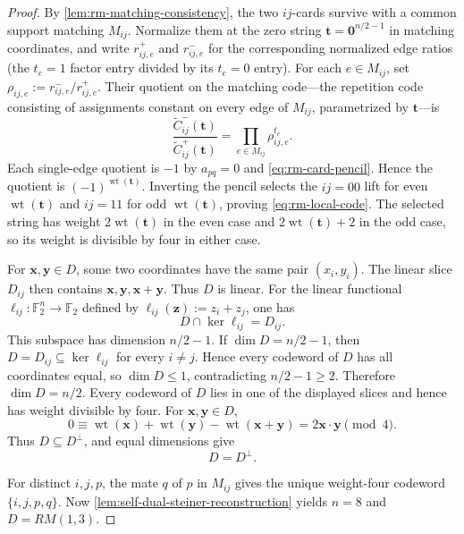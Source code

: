 \documentclass[11pt,letterpaper,onecolumn]{article}
\theoremstyle{plain}
\theoremstyle{definition}
\theoremstyle{remark}
\newcommand{\Ftwo}{\mathbb F_2}
\newcommand{\wt}{\operatorname{wt}}
\newcommand{\zero}{\mathbf 0}
\begin{document}
\begin{proof}
By \cref{lem:rm-matching-consistency}, the two \(ij\)-cards survive with a
common support matching \(M_{ij}\).  Normalize them at the zero string
\({\mathbf t}=\zero^{n/2-1}\) in matching coordinates, and write \(r_{ij,e}^{+}\) and
\(r_{ij,e}^{-}\) for the corresponding normalized edge ratios (the
\(t_e=1\) factor entry divided by its \(t_e=0\) entry).  For each
\(e\in M_{ij}\), set \(\rho_{ij,e}:=r_{ij,e}^{-}/r_{ij,e}^{+}\).  Their
quotient on the matching code---the repetition code consisting of assignments
constant on every edge of \(M_{ij}\), parametrized by \({\mathbf t}\)---is
\[
  \frac{\widetilde C_{ij}^{-}({\mathbf t})}
       {\widetilde C_{ij}^{+}({\mathbf t})}
  =\prod_{e\in M_{ij}}\rho_{ij,e}^{t_e}.
\]
Each single-edge quotient is \(-1\) by \(a_{pq}=0\) and
\cref{eq:rm-card-pencil}. Hence the quotient is \((-1)^{\wt({\mathbf t})}\).  Inverting
the pencil selects the \(ij=00\) lift for even \(\wt({\mathbf t})\) and \(ij=11\) for
odd \(\wt({\mathbf t})\), proving \cref{eq:rm-local-code}. The selected string has
weight \(2\wt({\mathbf t})\) in the even case and \(2\wt({\mathbf t})+2\) in the odd case, so
its weight is divisible by four in either case.

For \({\mathbf{x}},{\mathbf{y}}\in D\), some two coordinates have the same pair
\((x_i,y_i)\). The linear slice \(D_{ij}\) then contains \({\mathbf{x}},{\mathbf{y}},{\mathbf{x}}+{\mathbf{y}}\).
Thus \(D\) is linear.  For the linear functional
\(\ell_{ij}:\Ftwo^n\to\Ftwo\) defined by
\(\ell_{ij}({\mathbf z}):=z_i+z_j\), one has
\[
  D\cap\ker\ell_{ij}=D_{ij}.
\]
This subspace has dimension \(n/2-1\).  If
\(\dim D=n/2-1\), then \(D=D_{ij}\subseteq\ker\ell_{ij}\) for every
\(i\ne j\).  Hence every codeword of \(D\) has all coordinates equal, so
\(\dim D\le1\), contradicting \(n/2-1\ge2\).  Therefore
\(\dim D=n/2\).
Every codeword of \(D\) lies in one of the displayed slices and hence has weight
divisible by four.  For \({\mathbf{x}},{\mathbf{y}}\in D\),
\[
 0\equiv \wt({\mathbf{x}})+\wt({\mathbf{y}})-\wt({\mathbf{x}}+{\mathbf{y}})=2{\mathbf{x}}\cdot {\mathbf{y}}\pmod 4.
\]
Thus \(D\subseteq D^\perp\), and equal dimensions give
\begin{equation*}
  D=D^\perp.
\end{equation*}

For distinct \(i,j,p\), the mate \(q\) of \(p\) in \(M_{ij}\) gives the
unique weight-four codeword \(\{i,j,p,q\}\).  Now
\cref{lem:self-dual-steiner-reconstruction} yields
\(n=8\) and \(D=RM(1,3)\).
\end{proof}
\end{document}
